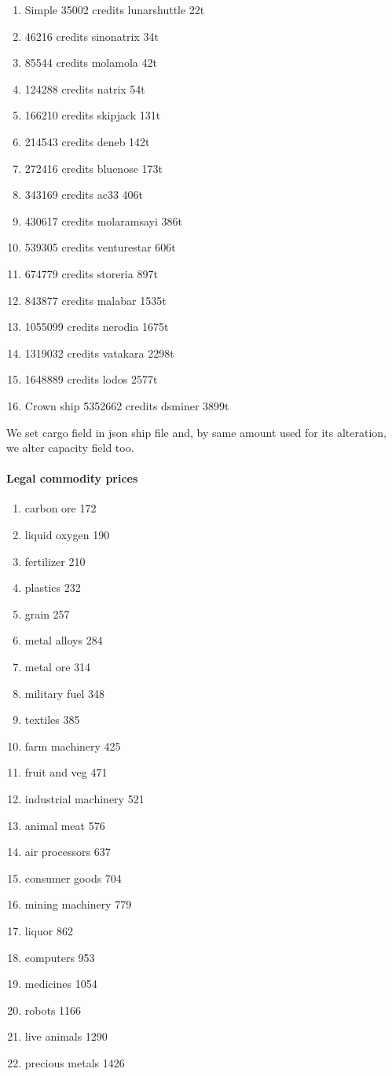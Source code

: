 \documentclass[]{article}
\begin{document}
\begin{enumerate}[label=\Roman*,start=0]
\item 	Simple 35002 credits lunarshuttle	22t
	\item 46216 credits	sinonatrix	34t
		\item 85544 credits	molamola	42t		
		\item 124288 credits	natrix	54t
	\item 166210  credits	skipjack	131t
	\item 214543 credits	deneb	142t			
	\item 272416 credits	bluenose	173t		
	\item 343169  credits	ac33	406t
\item 430617 credits	molaramsayi	386t	
	\item 539305  credits	venturestar	606t
	\item 674779 credits	storeria	897t	
	\item 843877 credits	malabar	1535t
	\item  1055099 credits	nerodia	1675t
	\item  1319032 credits	vatakara	2298t				
	\item 1648889 credits	lodos	2577t			
	\item Crown ship 5352662 credits dsminer	3899t
\end{enumerate}

We set cargo field in json ship file and, by same amount used for its alteration, we alter capacity field too.

\paragraph{Legal commodity prices}
\begin{enumerate}
\item 	carbon ore	172
\item 	liquid oxygen	190
\item 	fertilizer	210
\item 	plastics	232
\item 	grain	257
\item 	metal alloys	284
\item 	metal ore	314
\item 	military fuel	348
\item 	textiles	385
\item 	farm machinery	425
\item 	fruit and veg	471
\item 	industrial machinery	521
\item 	animal meat	576
\item 	air processors	637
\item 	consumer goods	704
\item 	mining machinery	779
\item 	liquor	862
\item 	computers	953
\item 	medicines	1054
\item 	robots	1166
\item 	live animals	1290
\item 	precious metals	1426	
\end{enumerate}
\end{document}
